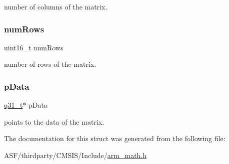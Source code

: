number of columns of the matrix. \mbox{\label{structarm__matrix__instance__q31_a1bcf80ccdc2acc29198f1592ae300390}} 
\subsubsection{\texorpdfstring{numRows}{numRows}}
{\footnotesize\ttfamily uint16\+\_\+t num\+Rows}

number of rows of the matrix. \mbox{\label{structarm__matrix__instance__q31_ad296f76577326ff280726323536eed6d}} 
\subsubsection{\texorpdfstring{pData}{pData}}
{\footnotesize\ttfamily \mbox{\hyperlink{arm__math_8h_adc89a3547f5324b7b3b95adec3806bc0}{q31\+\_\+t}}$\ast$ p\+Data}

points to the data of the matrix. 

The documentation for this struct was generated from the following file\+:\begin{DoxyCompactItemize}
\item 
A\+S\+F/thirdparty/\+C\+M\+S\+I\+S/\+Include/\mbox{\hyperlink{arm__math_8h}{arm\+\_\+math.\+h}}\end{DoxyCompactItemize}
